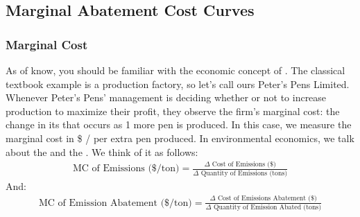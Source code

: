 \documentclass[letterpaper,10pt,english]{jupyterBook}
\begin{document}
\subsection{Marginal Abatement Cost Curves}
\label{\detokenize{content/12-environmental/textbook1:marginal-abatement-cost-curves}}\label{\detokenize{content/12-environmental/textbook1::doc}}

\subsubsection{Marginal Cost}
\label{\detokenize{content/12-environmental/textbook1:marginal-cost}}
\sphinxAtStartPar
As of know, you should be familiar with the economic concept of . The classical textbook example is a production factory, so let’s call ours Peter’s Pens Limited. Whenever Peter’s Pens’ management is deciding whether or not to increase production to maximize their profit, they observe the firm’s marginal cost: the change in its  that occurs as 1 more pen is produced. In this case, we measure the marginal cost in \$ / per extra pen produced. In environmental economics, we talk about the  and the . We think of it as follows:
\begin{equation*}
\begin{split} \text{MC of Emissions (\$/ton)} = \frac{\text{$\Delta$ Cost of Emissions (\$)}}{\text{$\Delta$ Quantity of Emissions (tons)}}\end{split}
\end{equation*}
\sphinxAtStartPar
And:
\begin{equation*}
\begin{split} \text{MC of Emission Abatement (\$/ton)} = \frac{\text{$\Delta$ Cost of Emissions Abatement (\$)}}{\text{$\Delta$ Quantity of Emission Abated (tons)}}\end{split}
\end{equation*}
\end{document}
